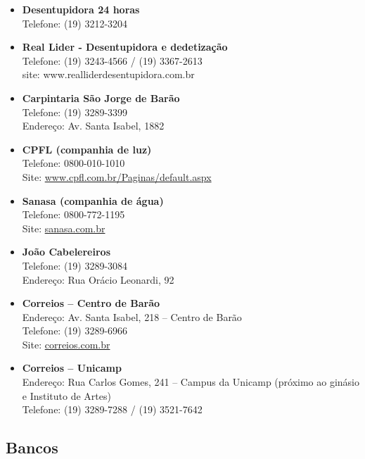 \begin{itemize}
    \item  \textbf{Desentupidora 24 horas}
        \\Telefone: (19) 3212-3204

    \item  \textbf{Real Lider - Desentupidora e dedetização}
        \\Telefone: (19) 3243-4566 / (19) 3367-2613
        \\site: www.realliderdesentupidora.com.br

    \item  \textbf{Carpintaria São Jorge de Barão}
        \\Telefone: (19) 3289-3399
        \\Endereço: Av. Santa Isabel, 1882

    \item  \textbf{CPFL (companhia de luz)}
        \\Telefone: 0800-010-1010
        \\Site: \url{www.cpfl.com.br/Paginas/default.aspx}

    \item  \textbf{Sanasa (companhia de água)}
        \\Telefone: 0800-772-1195
        \\Site: \url{sanasa.com.br}

    \item  \textbf{João Cabelereiros}
        \\Telefone: (19) 3289-3084
        \\Endereço: Rua Orácio Leonardi, 92

    \item  \textbf{Correios -- Centro de Barão}
        \\Endereço: Av. Santa Isabel, 218 -- Centro de Barão
        \\Telefone: (19) 3289-6966
        \\Site: \url{correios.com.br}

    \item  \textbf{Correios -- Unicamp}
        \\Endereço: Rua Carlos Gomes, 241 -- Campus da Unicamp (próximo ao
        ginásio e Instituto de Artes)
        \\Telefone: (19) 3289-7288 / (19) 3521-7642
\end{itemize}

\subsection{Bancos}

